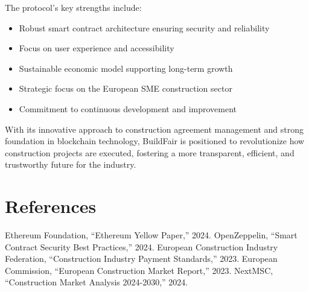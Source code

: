 \documentclass[12pt]{article}
\begin{document}
The protocol's key strengths include:
\begin{itemize}
    \item Robust smart contract architecture ensuring security and reliability
    \item Focus on user experience and accessibility
    \item Sustainable economic model supporting long-term growth
    \item Strategic focus on the European SME construction sector
    \item Commitment to continuous development and improvement
\end{itemize}

With its innovative approach to construction agreement management and strong foundation in blockchain technology, BuildFair is positioned to revolutionize how construction projects are executed, fostering a more transparent, efficient, and trustworthy future for the industry.

\section{References}
\begin{thebibliography}{9}
 Ethereum Foundation, ``Ethereum Yellow Paper,'' 2024.
 OpenZeppelin, ``Smart Contract Security Best Practices,'' 2024.
 European Construction Industry Federation, ``Construction Industry Payment Standards,'' 2023.
 European Commission, ``European Construction Market Report,'' 2023.
 NextMSC, ``Construction Market Analysis 2024-2030,'' 2024.
\end{thebibliography}
\end{document}
